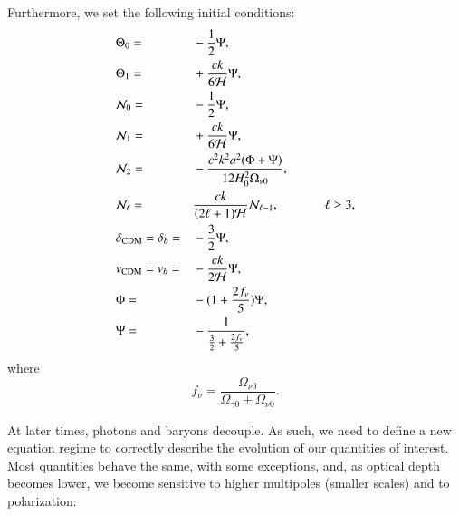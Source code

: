 \documentclass{aa}
\begin{document}
Furthermore, we set the following initial conditions:
\begin{align*}
    &\Theta_0 =&& -\frac{1}{2} \Psi, \\
    &\Theta_1 =&& +\frac{ck}{6\mathcal{H}}\Psi, \\
    &\mathcal{N}_0 =&& -\frac{1}{2} \Psi, \\
    &\mathcal{N}_1 =&& +\frac{ck}{6\mathcal{H}}\Psi, \\
    &\mathcal{N}_2 =&& -\frac{c^2k^2 a^2 (\Phi+\Psi)}{12H_0^2\Omega_{\nu 0}},\\
    &\mathcal{N}_\ell =&& \frac{ck}{(2\ell+1)\mathcal{H}} \mathcal{N}_{\ell-1}, &\quad\quad \ell \ge 3,\\
    &\delta_{\rm CDM} = \delta_b =&& -\frac{3}{2} \Psi, \\
    &v_{\rm CDM} = v_b =&& -\frac{ck}{2\mathcal{H}} \Psi,\\
    &\Phi =&& -(1+\frac{2f_\nu}{5})\Psi, \\
    &\Psi =&& -\frac{1}{\frac{3}{2} + \frac{2f_\nu}{5}},\\
\end{align*}
where
\begin{equation}
f_{\nu} = \frac{\Omega_{\nu 0}}{\Omega_{\gamma 0} + \Omega_{\nu 0}}.
\end{equation}

At later times, photons and baryons decouple. As such, we need to define a new equation regime to correctly describe the evolution of our quantities of interest. Most quantities behave the same, with some exceptions, and, as optical depth becomes lower, we become sensitive to higher multipoles (smaller scales) and to polarization:
\end{document}
